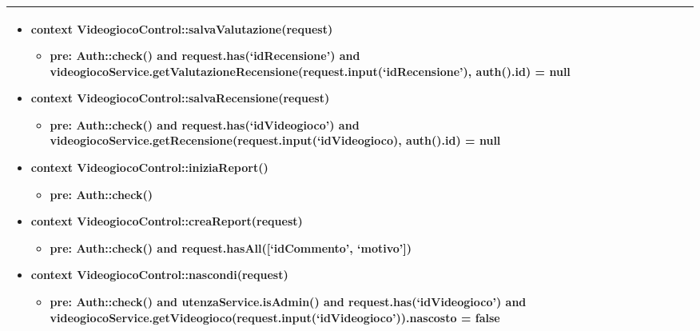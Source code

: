 \begin{tabular}{|| l | p{28.5em} ||}
\begin{itemize}[leftmargin=*]
	\item \textbf{context} VideogiocoControl::salvaValutazione(request)
	\begin{itemize}
		\item[ ] \textbf{pre:} Auth::check() and request.has(‘idRecensione’) and videogiocoService.getValutazioneRecensione(request.input(‘idRecensione’), auth().id) = null
	\end{itemize}

	\item \textbf{context} VideogiocoControl::salvaRecensione(request)
	\begin{itemize}
		\item[ ] \textbf{pre:} Auth::check() and request.has(‘idVideogioco’) and videogiocoService.getRecensione(request.input(‘idVideogioco), auth().id) = null
	\end{itemize}

	\item \textbf{context} VideogiocoControl::iniziaReport()
	\begin{itemize}
		\item[ ] \textbf{pre:} Auth::check()
	\end{itemize}

	\item \textbf{context} VideogiocoControl::creaReport(request)
	\begin{itemize}
		\item[ ] \textbf{pre:} Auth::check()
		and request.hasAll([‘idCommento’, ‘motivo’])	
	\end{itemize}

	\item \textbf{context} VideogiocoControl::nascondi(request)
	\begin{itemize}
		\item[ ] \textbf{pre:} Auth::check() and utenzaService.isAdmin() and request.has(‘idVideogioco’) and videogiocoService.getVideogioco(request.input(‘idVideogioco’)).nascosto = false	
	\end{itemize}
\end{itemize}\\
\hline
\end{tabular}

\newpage
